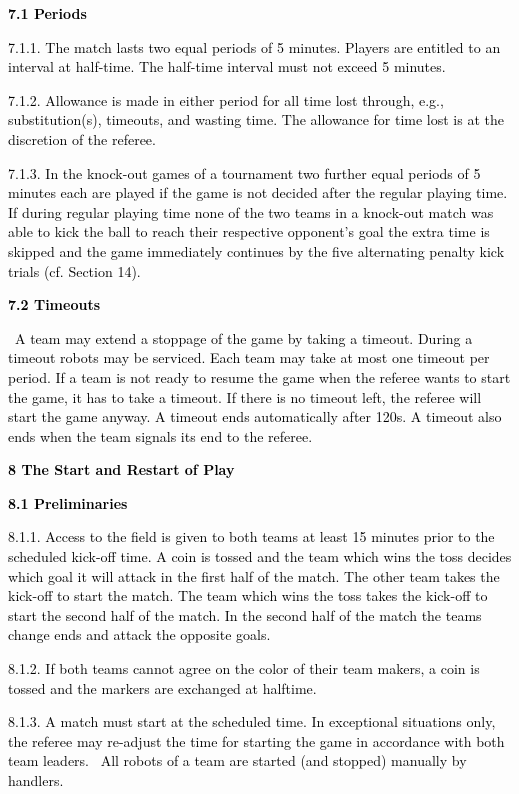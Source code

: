 \documentclass[a4paper]{article}
\begin{document}
\textbf{\textcolor{black}{7.1 Periods}}

\textcolor{black}{7.1.1. The match lasts two equal periods of 5 minutes. Players are entitled to an interval at
half-time. The half-time interval must not exceed 5 minutes.}

\textcolor{black}{7.1.2. Allowance is made in either period for all time lost through, e.g., substitution(s), timeouts,
and wasting time. The allowance for time lost is at the discretion of the referee.}

\textcolor{black}{7.1.3. In the knock-out games of a tournament two further equal periods of 5 minutes each are played
if the game is not decided after the regular playing time. If during regular playing time none of the two teams in a
knock-out match was able to kick the ball to reach their respective opponent's goal the extra time is skipped and the
game immediately continues by the five alternating penalty kick trials (cf. Section 14).}

\textbf{\textcolor{black}{7.2 Timeouts}}

\textcolor{black}{\ A team may extend a stoppage of the game by taking a timeout. During a timeout robots may be
serviced. Each team may take at most one timeout per period. If a team is not ready to resume the game when the referee
wants to start the game, it has to take a timeout. If there is no timeout left, the referee will start the game anyway.
A timeout ends automatically after 120s. A timeout also ends when the team signals its end to the referee.}


\bigskip

\textbf{\textcolor{black}{8 The Start and Restart of Play}}

\textbf{\textcolor{black}{8.1 Preliminaries}}

\textcolor{black}{8.1.1. Access to the field is given to both teams at least 15 minutes prior to the scheduled kick-off
time. A coin is tossed and the team which wins the toss decides which goal it will attack in the first half of the
match. The other team takes the kick-off to start the match. The team which wins the toss takes the kick-off to start
the second half of the match. In the second half of the match the teams change ends and attack the opposite goals.}

\textcolor{black}{8.1.2. If both teams cannot agree on the color of their team makers, a coin is tossed and the markers
are exchanged at halftime.}

\textcolor{black}{8.1.3. A match must start at the scheduled time. In exceptional situations only, the referee may
re-adjust the time for starting the game in accordance with both team leaders. \ All robots of a team are started (and
stopped) manually by handlers.}
\end{document}
